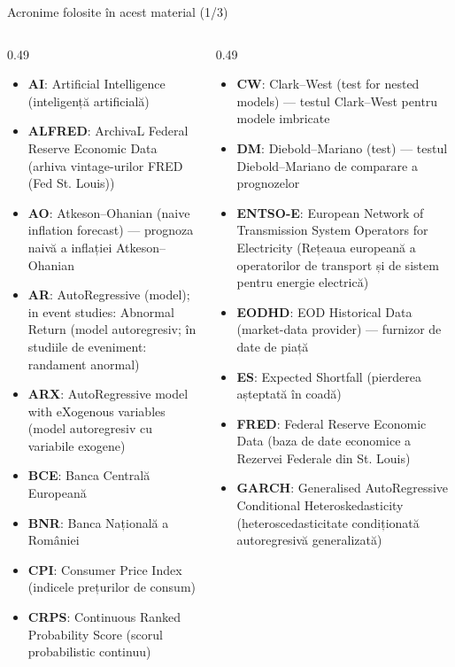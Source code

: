 {
\begin{frame}[noframenumbering]
    \titlepage
\end{frame}
}
\begin{frame}{Acronime folosite în acest material (1/3)}
\begin{columns}[T]
\begin{column}{0.49\textwidth}
\begin{itemize}\setlength{\itemsep}{0pt}
    \item \textbf{AI}: Artificial Intelligence (inteligență artificială)
    \item \textbf{ALFRED}: ArchivaL Federal Reserve Economic Data (arhiva vintage-urilor FRED (Fed St. Louis))
    \item \textbf{AO}: Atkeson–Ohanian (naive inflation forecast) — prognoza naivă a inflației Atkeson–Ohanian
    \item \textbf{AR}: AutoRegressive (model); in event studies: Abnormal Return (model autoregresiv; în studiile de eveniment: randament anormal)
    \item \textbf{ARX}: AutoRegressive model with eXogenous variables (model autoregresiv cu variabile exogene)
    \item \textbf{BCE}: Banca Centrală Europeană
    \item \textbf{BNR}: Banca Națională a României
    \item \textbf{CPI}: Consumer Price Index (indicele prețurilor de consum)
    \item \textbf{CRPS}: Continuous Ranked Probability Score (scorul probabilistic continuu)
\end{itemize}
\end{column}
\begin{column}{0.49\textwidth}
\begin{itemize}\setlength{\itemsep}{0pt}
    \item \textbf{CW}: Clark–West (test for nested models) — testul Clark–West pentru modele imbricate
    \item \textbf{DM}: Diebold–Mariano (test) — testul Diebold–Mariano de comparare a prognozelor
    \item \textbf{ENTSO-E}: European Network of Transmission System Operators for Electricity (Rețeaua europeană a operatorilor de transport și de sistem pentru energie electrică)
    \item \textbf{EODHD}: EOD Historical Data (market-data provider) — furnizor de date de piață
    \item \textbf{ES}: Expected Shortfall (pierderea așteptată în coadă)
    \item \textbf{FRED}: Federal Reserve Economic Data (baza de date economice a Rezervei Federale din St. Louis)
    \item \textbf{GARCH}: Generalised AutoRegressive Conditional Heteroskedasticity (heteroscedasticitate condiționată autoregresivă generalizată)
\end{itemize}
\end{column}
\end{columns}
\end{frame}
